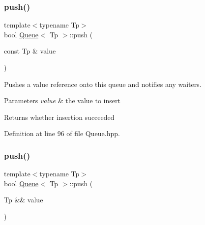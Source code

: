 \subsubsection{\texorpdfstring{push()}{push()}\hspace{0.1cm}{\footnotesize\ttfamily [1/2]}}
{\footnotesize\ttfamily template$<$typename Tp$>$ \\
bool \mbox{\hyperlink{classQueue}{Queue}}$<$ Tp $>$\+::push (\begin{DoxyParamCaption}\item[{const Tp \&}]{value }\end{DoxyParamCaption})\hspace{0.3cm}{\ttfamily [inline]}}

Pushes a value reference onto this queue and notifies any waiters.


\begin{DoxyParams}{Parameters}
{\em value} & the value to insert \\
\hline
\end{DoxyParams}
\begin{DoxyReturn}{Returns}
whether insertion succeeded 
\end{DoxyReturn}


Definition at line 96 of file Queue.\+hpp.


\begin{DoxyCode}{0}

\end{DoxyCode}
\mbox{\label{classQueue_a372de387e3016b225798697ac2c18401}} 
\subsubsection{\texorpdfstring{push()}{push()}\hspace{0.1cm}{\footnotesize\ttfamily [2/2]}}
{\footnotesize\ttfamily template$<$typename Tp$>$ \\
bool \mbox{\hyperlink{classQueue}{Queue}}$<$ Tp $>$\+::push (\begin{DoxyParamCaption}\item[{Tp \&\&}]{value }\end{DoxyParamCaption})\hspace{0.3cm}{\ttfamily [inline]}}

